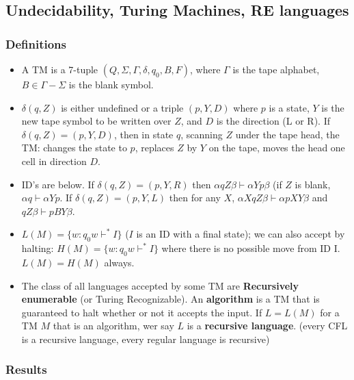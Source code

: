 \subsection{\color{ForestGreen}Undecidability, Turing Machines, RE languages}
\subsubsection{Definitions}
\begin{itemize}
    \item A TM is a 7-tuple \( (Q, \Sigma, \Gamma , \delta , q_0, B, F) \), where \( \Gamma \) is the tape alphabet, \( B \in  \Gamma - \Sigma \) is the blank symbol. 
    \item \( \delta (q, Z) \) is either undefined or a triple \( (p, Y, D) \) where \( p \) is a state, \( Y \) is the new tape symbol to be written over \( Z \), and \( D \) is the direction (L or R). If \( \delta (q, Z) = (p, Y, D) \), then in state \( q \), scanning \( Z \) under the tape head, the TM: changes the state to \( p \), replaces \( Z \) by \( Y \) on the tape, moves the head one cell in direction \( D \). 
    \item ID's are below. If \( \delta (q, Z) = (p, Y,R) \) then \( \alpha q Z \beta \vdash \alpha Y p \beta \) (if \( Z \) is blank, \( \alpha q \vdash \alpha Y p \). If \( \delta (q, Z) = (p , Y, L) \) then for any \( X \), \( \alpha X q Z \beta \vdash \alpha p XY \beta \) and \(  q Z \beta \vdash p B Y \beta \).
    \item \( L(M) = \{ w : q_0w \vdash^{*} I \}  \) (\( I \) is an ID with a final state); we can also accept by halting: \( H(M) = \{ w : q_0 w \vdash^{*} I \}  \) where there is no possible move from ID I. \( L(M) = H(M) \) always.
    \item The class of all languages accepted by some TM are \textbf{Recursively enumerable} (or Turing Recognizable). An \textbf{algorithm} is a TM that is guaranteed to halt whether or not it accepts the input. If \( L = L(M) \) for a TM \( M \) that is an algorithm, wer say \( L \) is a \textbf{recursive language}. (every CFL is a recursive language, every regular language is recursive)
\end{itemize}
\subsubsection{Results}
